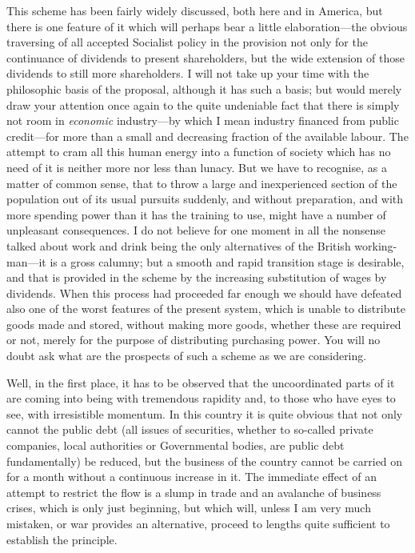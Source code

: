 \documentclass{book}
\begin{document}
This scheme has been fairly widely discussed, both here and in America, but there is one feature of it which will perhaps bear a little elaboration—the obvious traversing of all accepted Socialist policy in the provision not only for the continuance of dividends to present shareholders, but the wide extension of those dividends to still more shareholders. I will not take up your time with the philosophic basis of the proposal, although it has such a basis; but would merely draw your attention once again to the quite undeniable fact that there is simply not room in \emph{economic} industry—by which I mean industry financed from public credit—for more than a small and decreasing fraction of the available labour. The attempt to cram all this human energy into a function of society which has no need of it is neither more nor less than lunacy. But we have to recognise, as a matter of common sense, that to throw a large and inexperienced section of the population out of its usual pursuits suddenly, and without preparation, and with more spending power than it has the training to use, might have a number of unpleasant consequences. I do not believe for one moment in all the nonsense talked about work and drink being the only alternatives of the British working-man—it is a gross calumny; but a smooth and rapid transition stage is desirable, and that is provided in the scheme by the increasing substitution of wages by dividends. When this process had proceeded far enough we should have defeated also one of the worst features of the present system, which is unable to distribute goods made and stored, without making more goods, whether these are required or not, merely for the purpose of distributing purchasing power. You will no doubt ask what are the prospects of such a scheme as we are considering.

Well, in the first place, it has to be observed that the uncoordinated parts of it are coming into being with tremendous rapidity and, to those who have eyes to see, with irresistible momentum. In this country it is quite obvious that not only cannot the public debt (all issues of securities, whether to so-called private companies, local authorities or Governmental bodies, are public debt fundamentally) be reduced, but the business of the country cannot be carried on for a month without a continuous increase in it. The immediate effect of an attempt to restrict the flow is a slump in trade and an avalanche of business crises, which is only just beginning, but which will, unless I am very much mistaken, or war provides an alternative, proceed to lengths quite sufficient to establish the principle.
\end{document}
